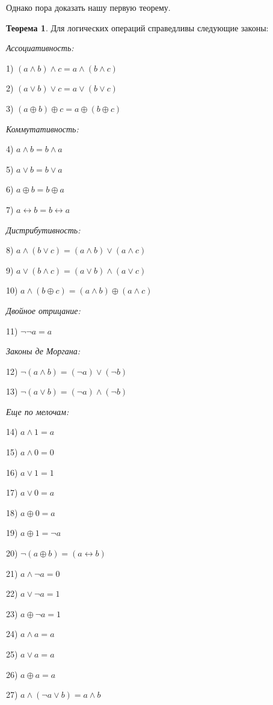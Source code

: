 Однако пора доказать нашу первую теорему.

{\bfseries Теорема 1}. Для логических операций справедливы следующие законы:

{\slshape Ассоциативность:}

1) $(a \wedge b) \wedge c = a \wedge (b \wedge c)$

2) $(a \vee b) \vee c = a \vee (b \vee c)$

3) $(a \oplus b) \oplus c = a \oplus (b \oplus c)$

{\slshape Коммутативность:}

4) $a \wedge b = b \wedge a$

5) $a \vee b = b \vee a$

6) $a \oplus b = b \oplus a$

7) $a \leftrightarrow b = b \leftrightarrow a$

{\slshape Дистрибутивность:}

8) $a \wedge (b \vee c) = (a \wedge b) \vee (a \wedge c)$

9) $a \vee (b \wedge c) = (a \vee b) \wedge (a \vee c)$

10) $a \wedge (b \oplus c) = (a \wedge b) \oplus (a \wedge c)$

{\slshape Двойное отрицание:}

11) $\neg\neg a = a$

{\slshape Законы де Моргана:}

12) $\neg (a \wedge b) = (\neg a) \vee (\neg b)$

13) $\neg (a \vee b) = (\neg a) \wedge (\neg b)$

{\slshape Еще по мелочам:}

14) $a \wedge 1 = a$

15) $a \wedge 0 = 0$

16) $a \vee 1 = 1$

17) $a \vee 0 = a$

18) $a \oplus 0 = a$

19) $a \oplus 1 = \neg a$

20) $\neg (a \oplus b) = (a \leftrightarrow b)$

21) $a \wedge \neg a = 0$

22) $a \vee \neg a = 1$

23) $a \oplus \neg a = 1$

24) $a\wedge a = a$

25) $a \vee a = a$

26) $a \oplus a = a$

27) $a \wedge (\neg a \vee b) = a \wedge b$

